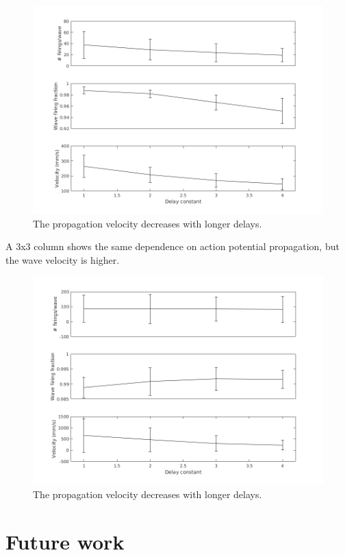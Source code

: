 \documentclass[a4paper,11pt]{article}
\begin{document}
\begin{figure}[ht]
 \caption{The propagation velocity decreases with longer delays.}
 \label{fig:delay_compare}
 \centering
   \includegraphics[width=\textwidth]{fig/DelayMult_2x2}
\end{figure}
A 3x3 column shows the same dependence on action potential propagation, but the wave velocity is higher.
\begin{figure}[ht]
 \caption{The propagation velocity decreases with longer delays.}
 \label{fig:delay_compare}
 \centering
   \includegraphics[width=\textwidth]{fig/DelayMult_3x3}
\end{figure}




\section{Future work}


\clearpage
\printbibliography
\end{document}
